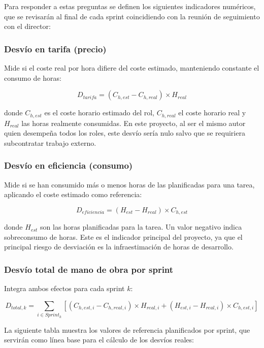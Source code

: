 \documentclass{article}
\begin{document}
    \justify
    Para responder a estas preguntas se definen los siguientes indicadores numéricos, 
    que se revisarán al final de cada sprint coincidiendo con la reunión de seguimiento 
    con el director:

    \subsubsection*{Desvío en tarifa (precio)}
    \justify
    Mide si el coste real por hora difiere del coste estimado, manteniendo constante 
    el consumo de horas:

    \[
    D_{tarifa} = (C_{h,est} - C_{h,real}) \times H_{real}
    \]

    donde $C_{h,est}$ es el coste horario estimado del rol, $C_{h,real}$ el coste 
    horario real y $H_{real}$ las horas realmente consumidas. En este proyecto, al 
    ser el mismo autor quien desempeña todos los roles, este desvío sería nulo salvo 
    que se requiriera subcontratar trabajo externo.

    \subsubsection*{Desvío en eficiencia (consumo)}
    \justify
    Mide si se han consumido más o menos horas de las planificadas para una tarea, 
    aplicando el coste estimado como referencia:

    \[
    D_{eficiencia} = (H_{est} - H_{real}) \times C_{h,est}
    \]

    donde $H_{est}$ son las horas planificadas para la tarea. Un valor negativo indica 
    sobreconsumo de horas. Este es el indicador principal del proyecto, ya que el 
    principal riesgo de desviación es la infraestimación de horas de desarrollo.

    \subsubsection*{Desvío total de mano de obra por sprint}
    \justify
    Integra ambos efectos para cada sprint $k$:

    \[
    D_{total,k} = \sum_{i \in Sprint_k} \left[ (C_{h,est,i} - C_{h,real,i}) \times 
    H_{real,i} + (H_{est,i} - H_{real,i}) \times C_{h,est,i} \right]
    \]

    \justify
    La siguiente tabla muestra los valores de referencia planificados por sprint, 
    que servirán como línea base para el cálculo de los desvíos reales:
\end{document}
